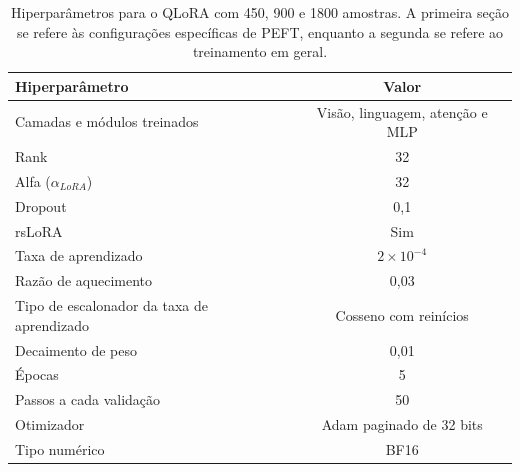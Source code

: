\begin{table}[ht]
    \caption{\small Hiperparâmetros para o \ac{QLoRA} com 450, 900 e 1800 amostras. A primeira seção se refere às configurações específicas de \ac{PEFT}, enquanto a
        segunda se refere ao treinamento em geral.}
    \centering
    \begin{tabular}{l|c}
        \hline
        Hiperparâmetro                             & Valor                                  \\ \hline
        Camadas e módulos treinados                & Visão, linguagem, atenção e \ac{MLP}   \\
        Rank                                       & 32                                     \\
        Alfa (\begin{math}\alpha_{LoRA}\end{math}) & 32                                     \\
        Dropout                                    & 0,1                                    \\
        \ac{rsLoRA}                                & Sim                                    \\ \hline
        Taxa de aprendizado                        & \begin{math}2 \times 10^{-4}\end{math} \\
        Razão de aquecimento                       & 0,03                                   \\
        Tipo de escalonador da taxa de aprendizado & Cosseno com reinícios                  \\
        Decaimento de peso                         & 0,01                                   \\
        Épocas                                     & 5                                      \\
        Passos a cada validação                    & 50                                     \\
        Otimizador                                 & \ac{Adam} paginado de 32 bits          \\
        Tipo numérico                              & \ac{BF16}                              \\ \hline
    \end{tabular}
    \label{tab:qlora_500_config}
\end{table}

